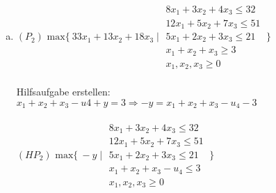 \documentclass[a4paper,10pt]{article}
\begin{document}
\begin{enumerate}[a)]
\[\begin{tabular}{cc|cc}
		\end{tabular}
		\setlength{\extrarowheight}{0pt}
		\]
		Da $B^+ = \{\varnothing\}$ ist kein Pivotelement w"ahlbar und das Problem somit nicht l"osbar.
		\item $(P_2) \text{ max} \{\ 33x_1 + 13x_2 + 18x_3 \mid \begin{matrix}
		8x_1 + 3x_2 + 4x_3 \leq 32\\
		12x_1 + 5x_2 +7x_3 \leq 51\\
		5x_1 + 2x_2 + 3x_3 \leq 21\\
		x_1 + x_2 + x_3 \geq 3\\
		x_1, x_2, x_3 \geq 0
		\end{matrix}
		\ \} $\\\\
		Hilfsaufgabe erstellen: $x_1 + x_2 + x_3 - u4 + y = 3 \Rightarrow -y = x_1 + x_2 + x_3 - u_4 - 3$\\\\
		$ (HP_2) \text{ max} \{\ -y \mid \begin{matrix}
		8x_1 + 3x_2 + 4x_3 \leq 32\\
		12x_1 + 5x_2 +7x_3 \leq 51\\
		5x_1 + 2x_2 + 3x_3 \leq 21\\
		x_1 + x_2 + x_3 - u_4 \leq 3\\
		x_1, x_2, x_3 \geq 0
		\end{matrix}
		\ \} $
		

\end{enumerate}
\end{document}

